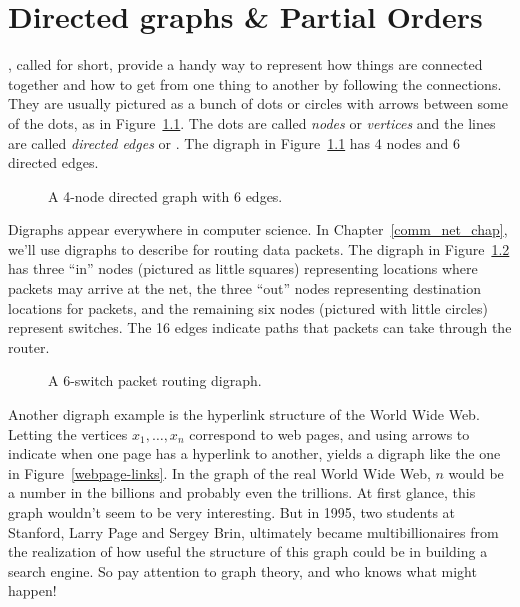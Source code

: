 \chapter{Directed graphs \& Partial Orders}\label{digraphs_chap}

, called  for short, provide a
handy way to represent how things are connected together and how to
get from one thing to another by following the connections.  They are
usually pictured as a bunch of dots or circles with arrows between
some of the dots, as in Figure~\ref{fig:4N6E}.  The dots are called
\emph{nodes} or \emph{vertices} and the lines are called
\emph{directed edges} or .  The digraph in
Figure~\ref{fig:4N6E} has 4 nodes and 6 directed edges.

\begin{figure}


\caption{A 4-node directed graph with 6 edges.}

\label{fig:4N6E}

\end{figure}

Digraphs appear everywhere in computer science.  In
Chapter~\ref{comm_net_chap}, we'll use digraphs to describe
 for routing data packets.  The digraph in
Figure~\ref{fig:6switchnet} has three ``in'' nodes (pictured as little
squares) representing locations where packets may arrive at the net,
the three ``out'' nodes representing destination locations for
packets, and the remaining six nodes (pictured with little circles)
represent switches.  The 16 edges indicate paths that packets can take
through the router.

\begin{figure}


\caption{A 6-switch packet routing digraph.}

\label{fig:6switchnet}
\end{figure}

Another digraph example is the hyperlink structure of the World Wide
Web.  Letting the vertices $x_1, \dots, x_n$ correspond to web pages,
and using arrows to indicate when one page has a hyperlink to another,
yields a digraph like the one in Figure~\ref{webpage-links}.  In the
graph of the real World Wide Web, $n$ would be a number in the
billions and probably even the trillions.  At first glance, this graph
wouldn't seem to be very interesting.  But in 1995, two students at
Stanford,  Larry Page and 
Sergey Brin, ultimately became multibillionaires from the realization
of how useful the structure of this graph could be in building a
search engine.  So pay attention to graph theory, and who knows what
might happen!

